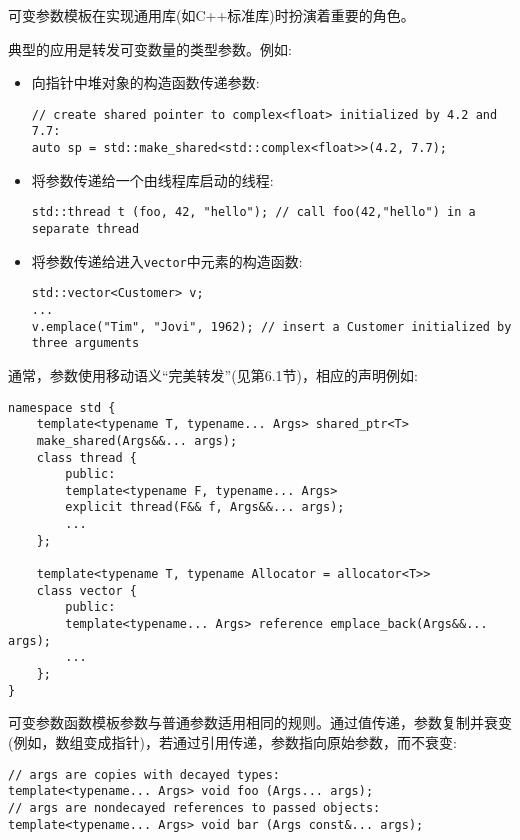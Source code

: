 可变参数模板在实现通用库(如C++标准库)时扮演着重要的角色。

典型的应用是转发可变数量的类型参数。例如:

\begin{itemize}
\item 
向指针中堆对象的构造函数传递参数:
\begin{lstlisting}[style=styleCXX]
// create shared pointer to complex<float> initialized by 4.2 and 7.7:
auto sp = std::make_shared<std::complex<float>>(4.2, 7.7);
\end{lstlisting}

\item 
将参数传递给一个由线程库启动的线程:
\begin{lstlisting}[style=styleCXX]
std::thread t (foo, 42, "hello"); // call foo(42,"hello") in a separate thread
\end{lstlisting}

\item 
将参数传递给进入\texttt{vector}中元素的构造函数:
\begin{lstlisting}[style=styleCXX]
std::vector<Customer> v;
...
v.emplace("Tim", "Jovi", 1962); // insert a Customer initialized by three arguments
\end{lstlisting}

\end{itemize}

通常，参数使用移动语义“完美转发”(见第6.1节)，相应的声明例如:

\begin{lstlisting}[style=styleCXX]
namespace std {
	template<typename T, typename... Args> shared_ptr<T>
	make_shared(Args&&... args);
	class thread {
		public:
		template<typename F, typename... Args>
		explicit thread(F&& f, Args&&... args);
		...
	};

	template<typename T, typename Allocator = allocator<T>>
	class vector {
		public:
		template<typename... Args> reference emplace_back(Args&&... args);
		...
	};
}
\end{lstlisting}

可变参数函数模板参数与普通参数适用相同的规则。通过值传递，参数复制并衰变(例如，数组变成指针)，若通过引用传递，参数指向原始参数，而不衰变:

\begin{lstlisting}[style=styleCXX]
// args are copies with decayed types:
template<typename... Args> void foo (Args... args);
// args are nondecayed references to passed objects:
template<typename... Args> void bar (Args const&... args);
\end{lstlisting}



































